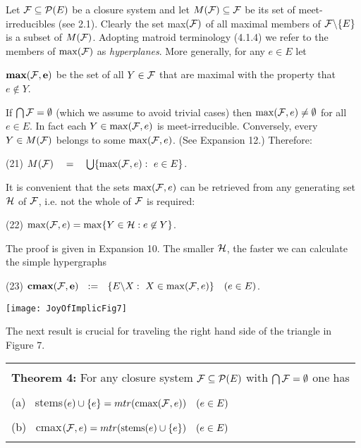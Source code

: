 \documentclass[11pt]{article}
\newcommand{\bmax}{\hbox{\boldmath$\max$}}
\begin{document}
Let ${\cal F} \subseteq {\cal P}(E)$ be a closure system and let $M({\cal F}) \subseteq {\cal F}$ be its set of meet-irreducibles (see 2.1). 
Clearly the set max$({\cal F})$ of all maximal members of ${\cal F} \backslash \{E\}$ is a subset of $M({\cal F})$. Adopting matroid terminology (4.1.4) we refer to the members of $\max({\cal F})$ as {\it hyperplanes}. More generally, for any $e \in E$ let 
\begin{center}
${\bf \bmax({\cal F},e)}$ be the set of all $Y \in {\cal F}$ that are maximal with the property that $e \not\in Y$. 
\end{center}
If $\bigcap {\cal F} = \emptyset$ (which we assume to avoid trivial cases) then $\max ({\cal F},e) \neq \emptyset$ for all $ e \in E$. In fact each $Y \in \max ({\cal F}, e)$ is meet-irreducible.
Conversely, every $Y \in M({\cal F})$ belongs to some $\max ({\cal F}, e)$. (See Expansion 12.)  
Therefore:

(21) \quad $M({\cal F}) \quad = \quad \bigcup \{\max ({\cal F}, e): \ e \in E\}$.

It is convenient that the sets $\max ({\cal F}, e)$ can be retrieved from any generating set ${\cal H}$ of ${\cal F}$, i.e. not the whole of ${\cal F}$ is required:

(22) \quad $\max ({\cal F}, e) = \max \{Y \in {\cal H}: e \not\in Y\}$.  


The proof is given in Expansion 10. 
The smaller ${\cal H}$, the faster we can calculate the simple hypergraphs

(23) \quad ${\bf cmax ({\cal F}, e)} \ \ : = \ \ \{E \backslash X: \ X \in \max({\cal F}, e)\} \quad (e\in E)$.


\begin{center}
\texttt{[image: JoyOfImplicFig7]}
\end{center}


The next result is crucial for traveling the right hand side of the triangle in Figure 7.

\begin{tabular}{|l|} \hline \\
{\bf Theorem 4:} For any closure system ${\cal F} \subseteq {\cal P}(E)$ with $\bigcap {\cal F} = \emptyset$  one has\\
\\
(a) \ stems$(e) \cup \{e\} = mtr(\mbox{cmax}({\cal F},e)) \quad (e \in E)$\\
\\
(b) \ cmax$({\cal F},e) = mtr(\mbox{stems}(e) \cup \{e\}) \quad (e \in E)$\\
\\
\hline \end{tabular}
\end{document}
